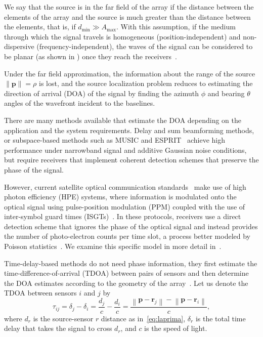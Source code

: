 \noindent
We say that the source is in the far field of the array if the distance between the elements of the array and the source is much greater than the distance between the elements, that is, if \(d_{\text{min}}\gg A_{\text{max}}\). 
With this assumption, if the medium through which the signal travels is homogeneous (position-independent) and non-dispersive (frequency-independent), the waves of the signal can be considered to be planar (as shown in ) once they reach the receivers~\cite{stoica2005spectral,van2002optimum,johnson1992array}.

\noindent
Under the far field approximation, the information about the range of the source \(\|\mathbf{p}\|=\rho\) is lost, and the source localization problem reduces to estimating the direction of arrival (DOA) of the signal by finding the {azimuth} \(\phi\) and bearing \(\theta\) angles of the wavefront incident to the baselines.

\noindent
There are many methods available that estimate the DOA depending on the application and the system requirements. Delay and sum beamforming methods, or subspace-based methods such as \mbox{MUSIC} and ESPRIT~\cite{van2002optimum,stoica2005spectral,benesty2008microphone,Falk2004} achieve high performance under narrowband signal and additive Gaussian noise conditions, but require receivers that implement coherent detection schemes that preserve the phase of the signal.

\noindent
However, current satellite optical communication standards~\cite{CCSDS} make use of high photon efficiency (HPE) systems, where information is modulated onto the optical signal using pulse-position modulation (PPM) coupled with the use of inter-symbol guard times (ISGTs)~\cite{rogalin2017synchronization,net2023optical}. In these protocols, receivers use a direct detection scheme that ignores the phase of the optical signal and instead provides the number of photo-electron counts per time slot, a process better modeled by Poisson statistics~\cite{gagliardi1995optical}. We examine this specific model in more detail in~.

\noindent
Time-delay-based methods do not need phase information, they first estimate the time-difference-of-arrival (TDOA) between pairs of sensors and then determine the DOA estimates according to the geometry of the array~\cite{Bimodal-sound-source-tracking}. Let us denote the TDOA between sensors \(i\) and \(j\) by
\begin{equation}
\tau_{ij} = \delta_j-\delta_i=\frac{d_j}{c}-\frac{d_i}{c}
=\frac{\left\|\mathbf{p}-\mathbf{r}_j\right\|- \left\|\mathbf{p}-\mathbf{r}_i\right\|}{c},
\label{eq:thehyperbolone}
\end{equation}
where \( d_r\) is the source-sensor \(r\) distance as in~\eqref{eq:laprima}, \(\delta_r\) is the total time delay that takes the signal to cross \( d_r\), and \(c\) is the speed of light.

